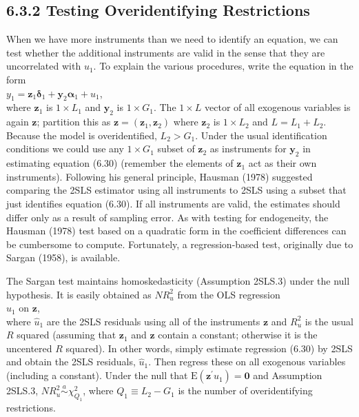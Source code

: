 \documentclass[10pt]{article}
\begin{document}
\subsection*{6.3.2 Testing Overidentifying Restrictions}
When we have more instruments than we need to identify an equation, we can test whether the additional instruments are valid in the sense that they are uncorrelated with $u_{1}$. To explain the various procedures, write the equation in the form\\
$y_{1}=\mathbf{z}_{1} \boldsymbol{\delta}_{1}+\mathbf{y}_{2} \boldsymbol{\alpha}_{1}+u_{1}$,\\
where $\mathbf{z}_{1}$ is $1 \times L_{1}$ and $\mathbf{y}_{2}$ is $1 \times G_{1}$. The $1 \times L$ vector of all exogenous variables is again $\mathbf{z}$; partition this as $\mathbf{z}=\left(\mathbf{z}_{1}, \mathbf{z}_{2}\right)$ where $\mathbf{z}_{2}$ is $1 \times L_{2}$ and $L=L_{1}+L_{2}$. Because the model is overidentified, $L_{2}>G_{1}$. Under the usual identification conditions we could use any $1 \times G_{1}$ subset of $\mathbf{z}_{2}$ as instruments for $\mathbf{y}_{2}$ in estimating equation (6.30) (remember the elements of $\mathbf{z}_{1}$ act as their own instruments). Following his general principle, Hausman (1978) suggested comparing the 2SLS estimator using all instruments to 2SLS using a subset that just identifies equation (6.30). If all instruments are valid, the estimates should differ only as a result of sampling error. As with testing for endogeneity, the Hausman (1978) test based on a quadratic form in the coefficient differences can be cumbersome to compute. Fortunately, a regression-based test, originally due to Sargan (1958), is available.

The Sargan test maintains homoskedasticity (Assumption 2SLS.3) under the null hypothesis. It is easily obtained as $N R_{u}^{2}$ from the OLS regression\\
$\hat{u}_{1}$ on $\mathbf{z}$,\\
where $\hat{u}_{1}$ are the 2SLS residuals using all of the instruments $\mathbf{z}$ and $R_{u}^{2}$ is the usual $R$ squared (assuming that $\mathbf{z}_{1}$ and $\mathbf{z}$ contain a constant; otherwise it is the uncentered $R$ squared). In other words, simply estimate regression (6.30) by 2SLS and obtain the 2SLS residuals, $\hat{u}_{1}$. Then regress these on all exogenous variables (including a constant). Under the null that $\mathrm{E}\left(\mathbf{z}^{\prime} u_{1}\right)=\mathbf{0}$ and Assumption 2SLS.3, $N R_{u}^{2} \stackrel{a}{\sim} \chi_{Q_{1}}^{2}$, where $Q_{1} \equiv L_{2}-G_{1}$ is the number of overidentifying restrictions.
\end{document}
